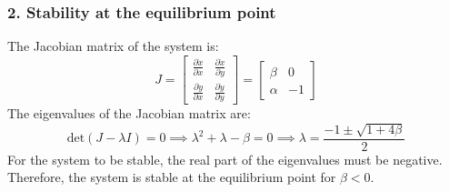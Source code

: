 \subsubsection*{2. Stability at the equilibrium point}

The Jacobian matrix of the system is:
\[
    J = \begin{bmatrix}
        \frac{\partial \dot{x}}{\partial x} & \frac{\partial \dot{x}}{\partial y} \\
        \frac{\partial \dot{y}}{\partial x} & \frac{\partial \dot{y}}{\partial y}
    \end{bmatrix}
    = \begin{bmatrix}
        \beta  & 0  \\
        \alpha & -1
    \end{bmatrix}
\]
The eigenvalues of the Jacobian matrix are:
\[
    \text{det}(J - \lambda I) = 0
    \implies
    \lambda^2 + \lambda - \beta = 0
    \implies
    \lambda = \frac{-1 \pm \sqrt{1 + 4\beta}}{2}
\]
For the system to be stable, the real part of the eigenvalues must be negative.
Therefore, the system is stable at the equilibrium point for \( \boxed{ \beta < 0 } \).
